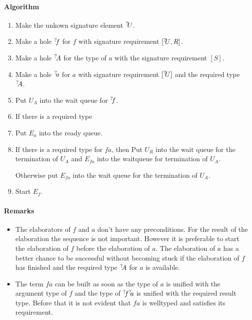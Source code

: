 \paragraph{Algorithm}
\begin{enumerate}
    \item Make the unkown signature element ${{}^? \kern-0.2em U}$.

    \item Make a hole ${{}^? \kern-0.2em f}$ for $f$ with signature requirement $[{{}^? \kern-0.2em U}, R]$.

    \item Make a hole ${{}^? \kern-0.2em A}$ for the type of $a$ with the signature
        requirement $[S]$.

    \item Make a hole ${{}^? \kern-0.2em a}$ for $a$ with signature requirement $[{{}^? \kern-0.2em U}]$
        and the
        required type ${{}^? \kern-0.2em A}$.

    \item Put $U_{A}$ into the wait queue for ${{}^? \kern-0.2em f}$.

    \item If there is a required type

    \item Put $E_a$ into the ready queue.

    \item If there is a required type for $fa$, then Put $U_R$ into the wait
        queue for the termination of $U_A$ and $E_{fa}$ into the waitqueue for
        termination of $U_A$.

        Otherwise put $E_{fa}$ into the wait queue for the termination of $U_A$.

    \item Start $E_f$.
\end{enumerate}


\paragraph{Remarks}

\begin{itemize}
    \item The elaborators of $f$ and $a$ don't have any preconditions. For the
        result of the elaboration the sequence is not important. However it is
        preferable to start the elaboration of $f$ before the elaboration of
        $a$. The elaboration of $a$ has a better chance to be successful without
        becoming stuck if the elaboration of $f$ has finished and the required
        type ${{}^? \kern-0.2em A}$ for $a$ is available.

    \item The term $fa$ can be built as soon as the type of $a$ is unified with
        the argument type of $f$ and the type of ${{}^? \kern-0.2em f} {{}^? \kern-0.2em a}$ is unified
        with the required result type. Before that it is not evident that $fa$ is
        welltyped and satisfies its requirement.
\end{itemize}




